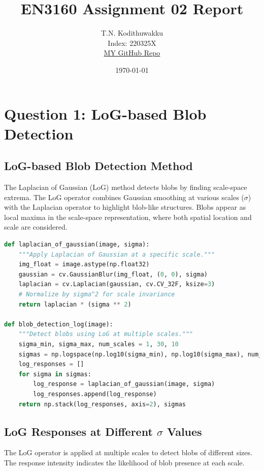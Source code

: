 \documentclass[10pt,a4paper,twocolumn]{article}
\title{EN3160 Assignment 02 Report}
\author{T.N. Kodithuwakku \\ Index: 220325X \\ \href{https://github.com/TNKodi/EN3160--A02.git}{MY GitHub Repo}}
\date{\today}
\begin{document}
\maketitle
\begin{@twocolumnfalse}

\vspace{1pt}
\end{@twocolumnfalse}


\section{Question 1: LoG-based Blob Detection}



\subsection*{LoG-based Blob Detection Method}
The Laplacian of Gaussian (LoG) method detects blobs by finding scale-space extrema. The LoG operator combines Gaussian smoothing at various scales ($\sigma$) with the Laplacian operator to highlight blob-like structures. Blobs appear as local maxima in the scale-space representation, where both spatial location and scale are considered.

\vspace{2pt}
\begin{lstlisting}[language=Python, style=mystyle]
def laplacian_of_gaussian(image, sigma):
    """Apply Laplacian of Gaussian at a specific scale."""
    img_float = image.astype(np.float32)
    gaussian = cv.GaussianBlur(img_float, (0, 0), sigma)
    laplacian = cv.Laplacian(gaussian, cv.CV_32F, ksize=3)
    # Normalize by sigma^2 for scale invariance
    return laplacian * (sigma ** 2)

def blob_detection_log(image):
    """Detect blobs using LoG at multiple scales."""
    sigma_min, sigma_max, num_scales = 1, 30, 10
    sigmas = np.logspace(np.log10(sigma_min), np.log10(sigma_max), num_scales)
    log_responses = []
    for sigma in sigmas:
        log_response = laplacian_of_gaussian(image, sigma)
        log_responses.append(log_response)
    return np.stack(log_responses, axis=2), sigmas

\end{lstlisting}

\vspace{2pt}

\subsection*{LoG Responses at Different $\sigma$ Values}
The LoG operator is applied at multiple scales to detect blobs of different sizes. The response intensity indicates the likelihood of blob presence at each scale.
\end{document}

